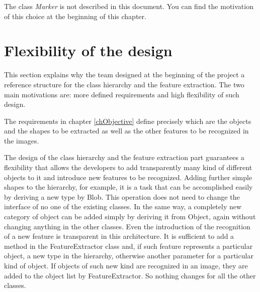 	The class \emph{Marker} is not described in this document. You can find the motivation of this choice at the beginning of this chapter.


	\section{Flexibility of the design}			
	This section explains why the team designed at the beginning of the project a reference structure for the class hierarchy and the feature extraction. The two main motivations are: more defined requirements and high flexibility of such design. %
	
	The requirements in chapter \ref{chObjective} define precisely which are the objects and the shapes to be extracted as well as the other features to be recognized in the images.

	The design of the class hierarchy and the feature extraction part guarantees a flexibility that allows the developers to add transparently many kind of different objects to it and introduce new features to be recognized.
	Adding further simple shapes to the hierarchy, for example, it is a task that can be accomplished easily by deriving a new type by Blob. This operation does not need to change the interface of no one of the existing classes.
	In the same way, a completely new category of object can be added simply by deriving it from Object, again without changing anything in the other classes. 
	Even the introduction of the recognition of a new feature is transparent in this architecture. It is sufficient to add a method in the FeatureExtractor class and, if such feature represents a particular object, a new type in the hierarchy, otherwise another parameter for a particular kind of object. If objects of such new kind are recognized in an image, they are added to the object list by FeatureExtractor. So nothing changes for all the other classes.

